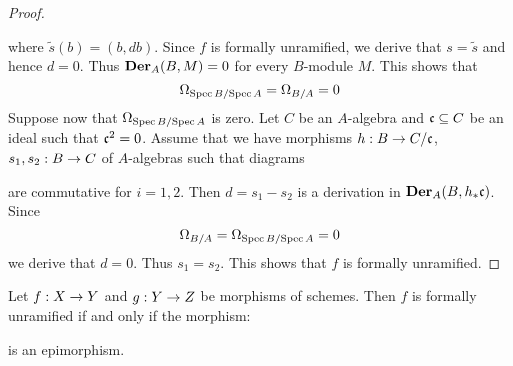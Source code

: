 \begin{proof}
\begin{center}
\begin{tikzpicture}
\end{tikzpicture}
\end{center}
where $\tilde{s}(b)=(b,db)$. Since $f$ is formally unramified, we derive that $s = \tilde{s}$ and hence $d = 0$. Thus $\bd{Der}_A(B,M)=0$ for every $B$-module $M$. This shows that $$\Omega_{\Spec B/\Spec A}= \Omega_{B/A} = 0$$
Suppose now that $\Omega_{\Spec B/\Spec A}$ is zero. Let $C$ be an $A$-algebra and $\ideal{c}\subseteq C$ be an ideal such that $\ideal{c}^2=0$. Assume that we have morphisms $h:B\ra C/\ideal{c}$, $s_1,s_2:B\ra C$ of $A$-algebras such that diagrams
\begin{center}
\end{center}
are commutative for $i=1,2$. Then $d=s_1-s_2$ is a derivation in $\bd{Der}_A(B,h_*\ideal{c})$. Since
$$\Omega_{B/A} = \Omega_{\Spec B/\Spec A}=0$$
we derive that $d=0$. Thus $s_1=s_2$. This shows that $f$ is formally unramified.
\end{proof}

\begin{corollary}\label{corollary:reformulation_of_characterization_of_formally_unramified_in_terms_of_differentials}
Let $f:X\ra Y$ and $g:Y\ra Z$ be morphisms of schemes. Then $f$ is formally unramified if and only if the morphism:
\begin{center}
\end{center}
is an epimorphism.
\end{corollary}


